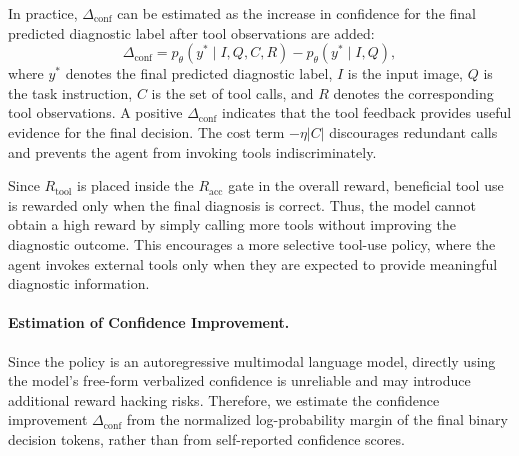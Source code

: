 \documentclass{llmxive}
\begin{document}
{In practice, $\Delta_{\text{conf}}$ can be estimated as the increase in confidence for the final predicted diagnostic label after tool observations are added:
\begin{equation}
\Delta_{\text{conf}}
=
p_{\theta}(y^{*} \mid I, Q, C, R)
-
p_{\theta}(y^{*} \mid I, Q),
\end{equation}
where $y^{*}$ denotes the final predicted diagnostic label, $I$ is the input image, $Q$ is the task instruction, $C$ is the set of tool calls, and $R$ denotes the corresponding tool observations. 
A positive $\Delta_{\text{conf}}$ indicates that the tool feedback provides useful evidence for the final decision. 
The cost term $-\eta |C|$ discourages redundant calls and prevents the agent from invoking tools indiscriminately.

Since $R_{\text{tool}}$ is placed inside the $R_{\text{acc}}$ gate in the overall reward, beneficial tool use is rewarded only when the final diagnosis is correct. 
Thus, the model cannot obtain a high reward by simply calling more tools without improving the diagnostic outcome. 
This encourages a more selective tool-use policy, where the agent invokes external tools only when they are expected to provide meaningful diagnostic information.

\paragraph{Estimation of Confidence Improvement.}
Since the policy is an autoregressive multimodal language model, directly using the model's free-form verbalized confidence is unreliable and may introduce additional reward hacking risks. 
Therefore, we estimate the confidence improvement $\Delta_{\text{conf}}$ from the normalized log-probability margin of the final binary decision tokens, rather than from self-reported confidence scores.

}
\end{document}
